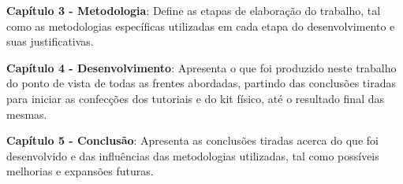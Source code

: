 \textbf{Capítulo 3 - Metodologia}: Define as etapas de elaboração do trabalho, tal como as metodologias específicas utilizadas em cada etapa do desenvolvimento e suas justificativas.

\textbf{Capítulo 4 - Desenvolvimento}: Apresenta o que foi produzido neste trabalho do ponto de vista de todas as frentes abordadas, partindo das conclusões tiradas para iniciar as confecções dos tutoriais e do kit físico, até o resultado final das mesmas.

\textbf{Capítulo 5 - Conclusão}: Apresenta as conclusões tiradas acerca do que foi desenvolvido e das influências das metodologias utilizadas, tal como possíveis melhorias e expansões futuras.
